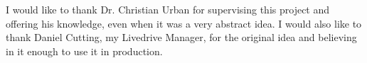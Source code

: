 I would like to thank Dr. Christian Urban for supervising this project and offering his knowledge, even when it was a very abstract idea. I would also like to thank Daniel Cutting, my Livedrive Manager, for the original idea and believing in it enough to use it in production. 